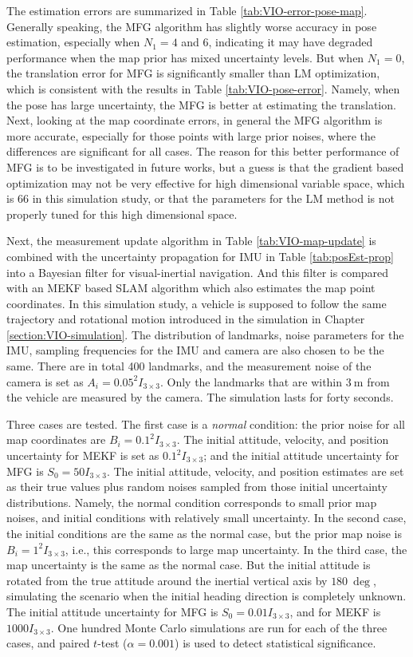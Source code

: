 The estimation errors are summarized in Table \ref{tab:VIO-error-pose-map}.
Generally speaking, the MFG algorithm has slightly worse accuracy in pose estimation, especially when $N_1 = 4$ and 6, indicating it may have degraded performance when the map prior has mixed uncertainty levels.
But when $N_1 = 0$, the translation error for MFG is significantly smaller than LM optimization, which is consistent with the results in Table \ref{tab:VIO-pose-error}.
Namely, when the pose has large uncertainty, the MFG is better at estimating the translation.
Next, looking at the map coordinate errors, in general the MFG algorithm is more accurate, especially for those points with large prior noises, where the differences are significant for all cases.
The reason for this better performance of MFG is to be investigated in future works, but a guess is that the gradient based optimization may not be very effective for high dimensional variable space, which is 66 in this simulation study, or that the parameters for the LM method is not properly tuned for this high dimensional space.

Next, the measurement update algorithm in Table \ref{tab:VIO-map-update} is combined with the uncertainty propagation for IMU in Table \ref{tab:posEst-prop} into a Bayesian filter for visual-inertial navigation.
And this filter is compared with an MEKF based SLAM algorithm which also estimates the map point coordinates.
In this simulation study, a vehicle is supposed to follow the same trajectory and rotational motion introduced in the simulation in Chapter \ref{section:VIO-simulation}.
The distribution of landmarks, noise parameters for the IMU, sampling frequencies for the IMU and camera are also chosen to be the same.
There are in total 400 landmarks, and the measurement noise of the camera is set as $A_i = 0.05^2I_{3\times 3}$.
Only the landmarks that are within $\SI{3}{\meter}$ from the vehicle are measured by the camera.
The simulation lasts for forty seconds.

Three cases are tested.
The first case is a \textit{normal} condition: the prior noise for all map coordinates are $B_i = 0.1^2I_{3\times 3}$.
The initial attitude, velocity, and position uncertainty for MEKF is set as $0.1^2I_{3\times 3}$; and the initial attitude uncertainty for MFG is $S_0 = 50I_{3\times 3}$.
The initial attitude, velocity, and position estimates are set as their true values plus random noises sampled from those initial uncertainty distributions.
Namely, the normal condition corresponds to small prior map noises, and initial conditions with relatively small uncertainty.
In the second case, the initial conditions are the same as the normal case, but the prior map noise is $B_i = 1^2I_{3\times 3}$, i.e., this corresponds to large map uncertainty.
In the third case, the map uncertainty is the same as the normal case.
But the initial attitude is rotated from the true attitude around the inertial vertical axis by $\SI{180}{\deg}$, simulating the scenario when the initial heading direction is completely unknown.
The initial attitude uncertainty for MFG is $S_0 = 0.01I_{3\times 3}$, and for MEKF is $1000I_{3\times 3}$.
One hundred Monte Carlo simulations are run for each of the three cases, and paired $t$-test ($\alpha=0.001$) is used to detect statistical significance.

